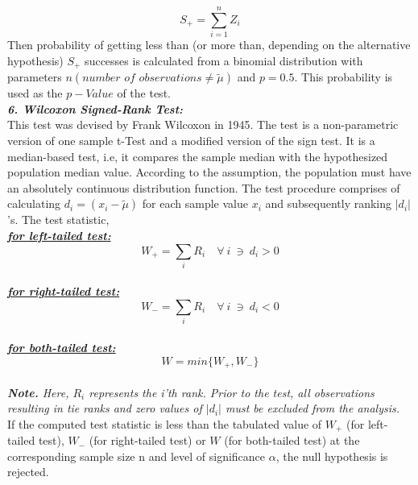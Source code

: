 \documentclass[12pt,a4paper]{report}
\begin{document}
\begin{equation}
  S_+ = \sum_{i=1}^{n} {Z_i}  
\end{equation}
\Large{Then probability of getting less than (or more than, depending on the alternative hypothesis) $S_+$ successes is calculated from a binomial distribution with parameters $n (\textit{number of observations}\neq\tilde{\mu})$ and $p=0.5$. This probability is used as the $p-Value$ of the test.}\\[20pt]
\Large{{\textbf{\textit{6. Wilcoxon Signed-Rank Test: }}} }\\[10pt]
\Large{This test was devised by Frank Wilcoxon in 1945. The test is a non-parametric version of one sample t-Test and a modified version of the sign test. It is a median-based test, i.e, it compares the sample median with the hypothesized population median value. According to the assumption, the population must have an absolutely continuous distribution function. The test procedure comprises of calculating $d_i = (x_i-\tilde{\mu})$ for each sample value $x_i$ and subsequently ranking $|d_i|$'s. The test statistic,}\\[20pt]
\Large{\textit{\textbf{\underline{for left-tailed test:}}}}\\[0.5pt]
\begin{equation}
W_+ = \sum_{i} R_i \quad \forall \ i \ \ni \ d_i>0
\end{equation}\\
\Large{\textit{\textbf{\underline{for right-tailed test:}}}}\\[0.5pt]
\begin{equation}
W_- = \sum_{i} R_i \quad \forall \ i \ \ni \ d_i<0 
\end{equation}\\
\Large{\textit{\textbf{\underline{for both-tailed test:}}}}\\[0.5pt]
\begin{equation}
W = min\{W_+,W_-\}
\end{equation}\\
\large{\textit{{\textbf{Note.}} Here, $R_i$ represents the i'th rank. Prior to the test, all observations resulting in tie ranks and zero values of $|d_i|$ must be excluded from the analysis.}}\\[10pt]
\Large{If the computed test statistic is less than the tabulated value of $W_+$ (for left-tailed test), $W_-$ (for right-tailed test) or $W$ (for both-tailed test) at the corresponding sample size n and level of significance $\alpha$, the null hypothesis is rejected.}\\[20pt]
\end{document}
